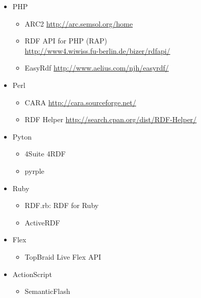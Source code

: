 \documentclass[xcolor=dvipsnames]{beamer}
\begin{document}
\begin{frame}[plain]
\begin{itemize}
	\item PHP
		\begin{itemize}
			\item ARC2                   \hfill {\scriptsize\url{http://arc.semsol.org/home}}
			\item RDF API for PHP (RAP)  \\\hfill {\scriptsize\url{http://www4.wiwiss.fu-berlin.de/bizer/rdfapi/}}
			\item EasyRdf                \hfill {\scriptsize\url{http://www.aelius.com/njh/easyrdf/}}
		\end{itemize}                  
	\item Perl                       
		\begin{itemize}                
			\item CARA                   \hfill {\scriptsize\url{http://cara.sourceforge.net/}}
			\item RDF Helper             \hfill {\scriptsize\url{http://search.cpan.org/dist/RDF-Helper/}}
		\end{itemize}
	\item Pyton
		\begin{itemize}
			\item 4Suite 4RDF
			\item pyrple 
		\end{itemize}
	\item Ruby
		\begin{itemize}
			\item RDF.rb: RDF for Ruby  
			\item ActiveRDF 
		\end{itemize}
	\item Flex
		\begin{itemize}
			\item TopBraid Live Flex API 
		\end{itemize}
	\item ActionScript
		\begin{itemize}
			\item SemanticFlash 
		\end{itemize}
\end{itemize}
\end{frame}
\end{document}
